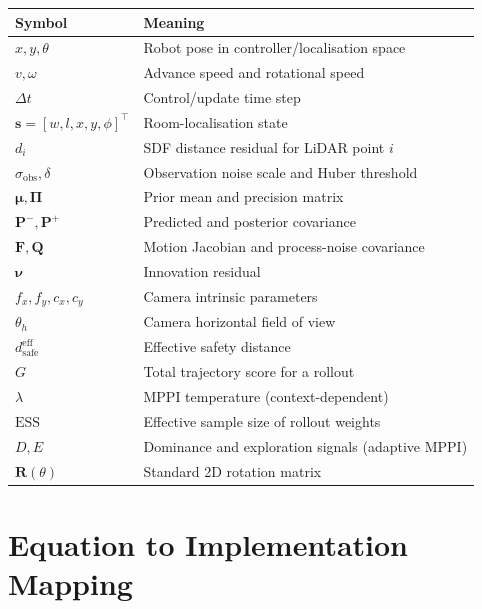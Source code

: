 \documentclass[a4paper, 11pt]{article}
\newcommand{\vect}[1]{\bm{#1}}
\newcommand{\mat}[1]{\bm{#1}}
\begin{document}
\begin{center}
\begin{tabular}{lp{10cm}}
  \toprule
  Symbol & Meaning \\
  \midrule
  $x, y, \theta$           & Robot pose in controller/localisation space \\
  $v, \omega$               & Advance speed and rotational speed \\
  $\Delta t$                & Control/update time step \\
  $\vect{s} = [w,l,x,y,\phi]^\top$ & Room-localisation state \\
  $d_i$                     & SDF distance residual for LiDAR point $i$ \\
  $\sigma_{\text{obs}}, \delta$ & Observation noise scale and Huber threshold \\
  $\vect{\mu}, \mat{\Pi}$   & Prior mean and precision matrix \\
  $\mat{P}^{-}, \mat{P}^{+}$ & Predicted and posterior covariance \\
  $\mat{F}, \mat{Q}$        & Motion Jacobian and process-noise covariance \\
  $\vect{\nu}$              & Innovation residual \\
  $f_x, f_y, c_x, c_y$     & Camera intrinsic parameters \\
  $\theta_h$                & Camera horizontal field of view \\
  $d_{\text{safe}}^{\text{eff}}$ & Effective safety distance \\
  $G$                       & Total trajectory score for a rollout \\
  $\lambda$                 & MPPI temperature (context-dependent) \\
  $\mathrm{ESS}$            & Effective sample size of rollout weights \\
  $D, E$                    & Dominance and exploration signals (adaptive MPPI) \\
  $\mat{R}(\theta)$         & Standard 2D rotation matrix \\
  \bottomrule
\end{tabular}
\end{center}

\section{Equation to Implementation Mapping}\label{sec:mapping}
\end{document}
